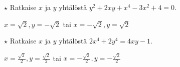 \begin{tehtavasivu}
\begin{tehtava}
    $\star$ Ratkaise $x$ ja $y$ yhtälöstä $y^2+2xy+x^4-3x^2+4=0$.
    \begin{vastaus}
        $x=\sqrt{2}, y=-\sqrt{2}$ tai $x=-\sqrt{2}, y=\sqrt{2}$
    \end{vastaus}
\end{tehtava}

\begin{tehtava} %
    $\star$ Ratkaise $x$ ja $y$ yhtälöstä $2x^4+2y^4=4xy-1$. %
    \begin{vastaus}
        $x=\frac{\sqrt{2}}{2}, y=\frac{\sqrt{2}}{2}$ tai $x=-\frac{\sqrt{2}}{2}, y=-\frac{\sqrt{2}}{2}$
    \end{vastaus}
\end{tehtava}

\end{tehtavasivu}

